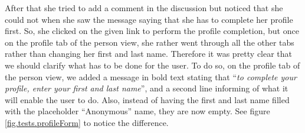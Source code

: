 \documentclass[a4paper,12pt, oneside]{article}
\begin{document}
After that she tried to add a comment in the discussion but noticed that she could not when she saw the message saying that she has to complete her profile first.
So, she clicked on the given link to perform the profile completion, but once on the profile tab of the person view, she rather went through all the other tabs rather than changing her first and last name.
Therefore it was pretty clear that we should clarify what has to be done for the user.
To do so, on the profile tab of the person view, we added a message in bold text stating that “\emph{to complete your profile, enter your first and last name}”, and a second line informing of what it will enable the user to do.
Also, instead of having the first and last name filled with the placeholder “Anonymous” name, they are now empty.
See figure \ref{fig.tests.profileForm} to notice the difference.
\end{document}
